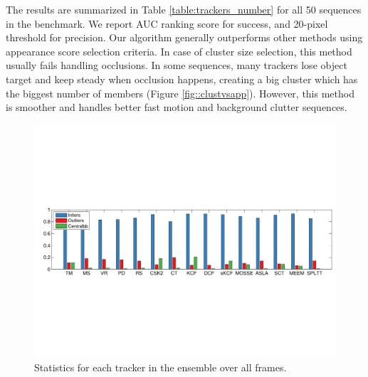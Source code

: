 \begin{table}[h!]
\centering
\caption{\small Average AUC and precision for live fusion methods tested in 50 videos
		dataset.}
\label{table:trackers_number}
\end{table}

The results are summarized in Table \ref{table:trackers_number} for all 50
sequences in the benchmark.
We report AUC ranking score for success, 
and 20-pixel threshold for precision.
%
%
Our algorithm generally outperforms other methods using
appearance score selection criteria. In case of cluster size selection,
this method usually fails handling occlusions. In some sequences, many trackers
lose object target and keep steady when occlusion happens, creating a big
cluster which has the biggest number of members (Figure \ref{fig::clustvsapp}).
However, this method is smoother and handles better fast motion and background
clutter sequences.

\begin{figure}[h!]
\centering
\includegraphics[width=1.0\linewidth, trim= 0.7cm 7.6cm 0.3cm 7.8cm, clip=true]{Figures/stats.pdf}
\caption{\small Statistics for each tracker in the ensemble over all frames. }
\label{fig:stats}
\end{figure}

